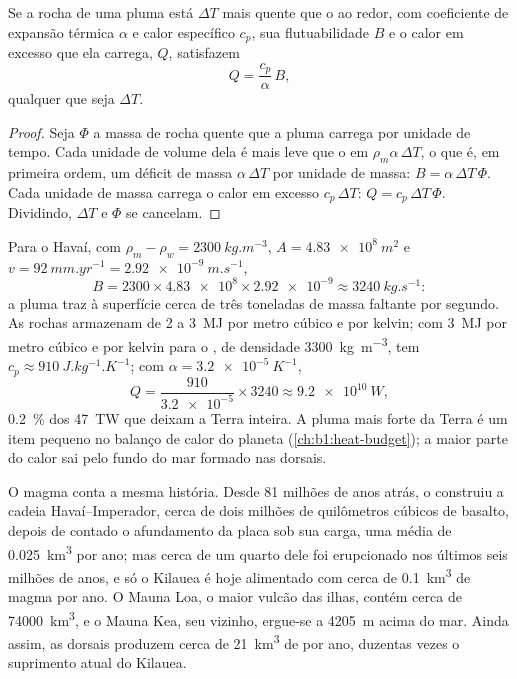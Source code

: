 \begin{proposition}\label{prop:b1:hotspots:heat}
Se a rocha de uma pluma está $\Delta T$ mais quente que o  ao redor, com coeficiente de expansão térmica $\alpha$ e calor específico $c_p$, sua flutuabilidade $B$ e o calor em excesso que ela carrega, $Q$, satisfazem
\[
  Q = \frac{c_p}{\alpha}\,B ,
\]
qualquer que seja $\Delta T$.
\end{proposition}

\begin{proof}
Seja $\Phi$ a massa de rocha quente que a pluma carrega por unidade de tempo. Cada unidade de volume dela é mais leve que o  em $\rho_m\alpha\,\Delta T$, o que é, em primeira ordem, um déficit de massa $\alpha\,\Delta T$ por unidade de massa: $B =
\alpha\,\Delta T\,\Phi$. Cada unidade de massa carrega o calor em excesso $c_p\,\Delta T$: $Q = c_p\,\Delta T\,\Phi$. Dividindo, $\Delta T$ e $\Phi$ se cancelam.
\end{proof}

Para o Havaí, com $\rho_m - \rho_w = \qty{2300}{kg.m^{-3}}$, $A =
\qty{4.83e8}{m^2}$ e $v = \qty{92}{mm.yr^{-1}} = \qty{2.92e-9}{m.s^{-1}}$,
\[
  B = 2300\times\num{4.83e8}\times\num{2.92e-9} \approx \qty{3240}{kg.s^{-1}}:
\]
a pluma traz à superfície cerca de três toneladas de massa faltante por segundo. As rochas armazenam de 2 a \qty{3}{MJ} por metro cúbico e por kelvin; com \qty{3}{MJ} por metro cúbico e por kelvin para o , de densidade \qty{3300}{kg.m^{-3}}, tem
$c_p \approx \qty{910}{J.kg^{-1}.K^{-1}}$; com $\alpha = \qty{3.2e-5}{K^{-1}}$,
\[
  Q = \frac{910}{\num{3.2e-5}}\times3240 \approx \qty{9.2e10}{W},
\]
\qty{0.2}{\percent} dos \qty{47}{TW} que deixam a Terra inteira. A pluma mais forte da Terra é um item pequeno no balanço de calor do planeta (\cref{ch:b1:heat-budget}); a maior parte do calor sai pelo fundo do mar formado nas dorsais.

O magma conta a mesma história. Desde 81 milhões de anos atrás, o  construiu a cadeia Havaí--Imperador, cerca de dois milhões de quilômetros cúbicos de basalto, depois de contado o afundamento da placa sob sua carga, uma média de \qty{0.025}{km^3} por ano; mas cerca de um quarto dele foi erupcionado nos últimos seis milhões de anos, e só o Kilauea é hoje alimentado com cerca de \qty{0.1}{km^3} de magma por ano. O Mauna Loa, o maior vulcão das ilhas, contém cerca de \qty{74000}{km^3}, e o Mauna Kea, seu vizinho, ergue-se a \qty{4205}{m} acima do mar. Ainda assim, as dorsais produzem cerca de \qty{21}{km^3} de  por ano, duzentas vezes o suprimento atual do Kilauea.

